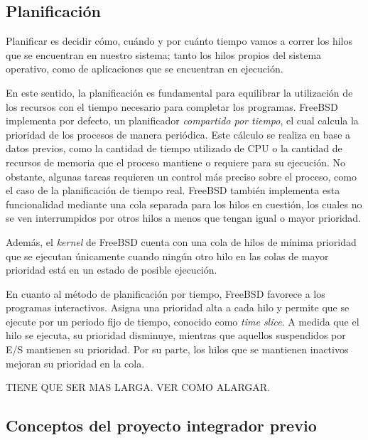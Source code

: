 \subsection{Planificación}

Planificar es decidir cómo, cuándo y por cuánto tiempo vamos a correr los hilos que se encuentran en nuestro sistema; tanto los hilos propios del sistema operativo, como de aplicaciones que se encuentran en ejecución.\par

En este sentido, la planificación es fundamental para equilibrar la utilización de los recursos con el tiempo necesario para completar los programas. FreeBSD implementa por defecto, un planificador \textit{compartido por tiempo}, el cual calcula la prioridad de los procesos de manera periódica. Este cálculo se realiza en base a datos previos, como la cantidad de tiempo utilizado de CPU o la cantidad de recursos de memoria que el proceso mantiene o requiere para su ejecución. No obstante, algunas tareas requieren un control más preciso sobre el proceso, como el caso de la planificación de tiempo real. FreeBSD también implementa esta funcionalidad mediante una cola separada para los hilos en cuestión, los cuales no se ven interrumpidos por otros hilos a menos que tengan igual o mayor prioridad.\par

Además, el \textit{kernel} de FreeBSD cuenta con una cola de hilos de mínima prioridad que se ejecutan únicamente cuando ningún otro hilo en las colas de mayor prioridad está en un estado de posible ejecución.\par

En cuanto al método de planificación por tiempo, FreeBSD favorece a los programas interactivos. Asigna una prioridad alta a cada hilo y permite que se ejecute por un periodo fijo de tiempo, conocido como \textit{time slice}. A medida que el hilo se ejecuta, su prioridad disminuye, mientras que aquellos suspendidos por E/S mantienen su prioridad. Por su parte, los hilos que se mantienen inactivos mejoran su prioridad en la cola.\par

TIENE QUE SER MAS LARGA. VER COMO ALARGAR.

\subsection{Conceptos del proyecto integrador previo}



